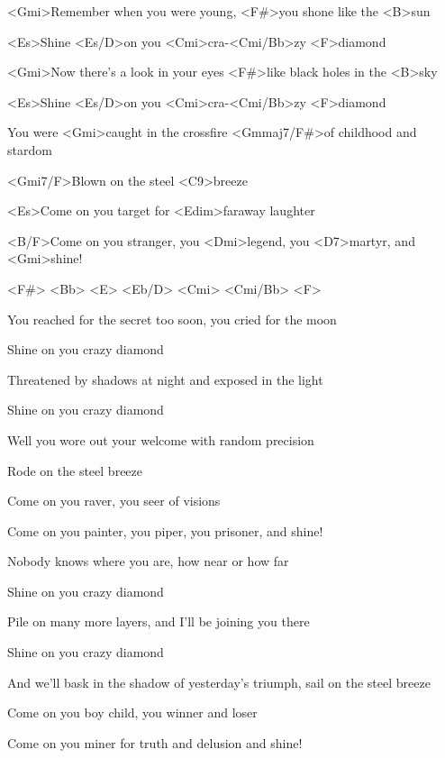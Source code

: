 

\zs
<Gmi>Remember when you were young,
<F#>you shone like the <B>sun

<Es>Shine <Es/D>on you <Cmi>cra-<Cmi/Bb>zy <F>diamond

<Gmi>Now there's a look in your eyes
<F#>like black holes in the <B>sky

<Es>Shine <Es/D>on you <Cmi>cra-<Cmi/Bb>zy <F>diamond

You were <Gmi>caught in the crossfire
<Gmmaj7/F#>of childhood and stardom

<Gmi7/F>Blown on the steel <C9>breeze

<Es>Come on you target for <Edim>faraway laughter

<B/F>Come on you stranger, you <Dmi>legend, you <D7>martyr, and <Gmi>shine!
\ks

<F#> <Bb> <E> <Eb/D> <Cmi> <Cmi/Bb> <F>

\zs
You reached for the secret too soon,
you cried for the moon

Shine on you crazy diamond

Threatened by shadows at night
and exposed in the light

Shine on you crazy diamond

Well you wore out your welcome
with random precision

Rode on the steel breeze

Come on you raver, you seer of visions

Come on you painter, you piper, you prisoner, and shine!
\ks

\zs
Nobody knows where you are,
how near or how far

Shine on you crazy diamond

Pile on many more layers,
and I'll be joining you there

Shine on you crazy diamond

And we'll bask in the shadow of yesterday's triumph,
sail on the steel breeze

Come on you boy child, you winner and loser

Come on you miner for truth and delusion and shine!
\ks

\kp





